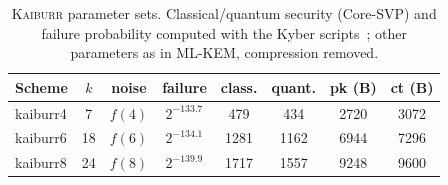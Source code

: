 \documentclass[journal=tches,preprint,floatrow]{iacrtrans}
\begin{document}
\begin{table}[H]
  \centering
  \footnotesize
  \setlength{\tabcolsep}{4pt}
  \caption{\textsc{Kaiburr} parameter sets. Classical/quantum security (Core-SVP) and failure probability computed with the Kyber scripts~\cite{kyber-estimates}; other parameters as in ML-KEM, compression removed.\protect\footnotemark}
\label{tab:kaiburr-params}
  \begin{tabular}{@{}lcc c
      S[table-format=3.0] S[table-format=3.0]
      S[table-format=4.0] S[table-format=4.0]@{}}
    \toprule
    Scheme & $k$ & noise & failure & {class.} & {quant.} & {pk (B)} & {ct (B)} \\
    \midrule
    kaiburr4 & 7  & $f(4)$ & $2^{-133.7}$ & {479} & {434} & 2720 & 3072 \\
    kaiburr6 & 18 & $f(6)$ & $2^{-134.1}$ & {1281} & {1162} & 6944 & 7296 \\
    kaiburr8 & 24 & $f(8)$ & $2^{-139.9}$ & {1717} & {1557} & 9248 & 9600 \\
    \bottomrule
  \end{tabular}
\end{table}

\end{document}
